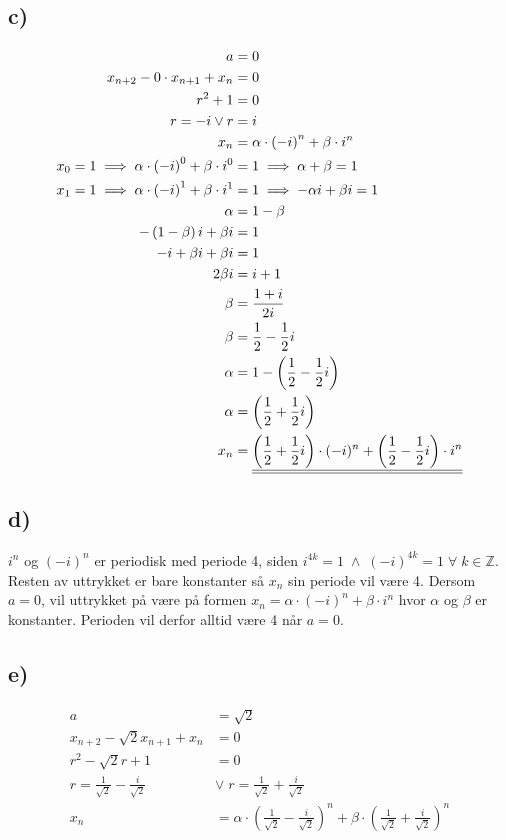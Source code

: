 \documentclass{article}
\begin{document}
\subsection*{c)}
\begin{align*}
	a&=0 \\
	x_{n+2}-0\cdot x_{n+1} + x_n &= 0\\
	r^2+1&=0\\
	r = -i \vee r &= i\\
	x_n &= \alpha \cdot \left(-i\right)^n + \beta \cdot i^n\\
	x_0 = 1 \implies \alpha \cdot \left(-i\right)^0 + \beta \cdot i^0 &= 1 \implies \alpha + \beta = 1\\
	x_1 = 1 \implies \alpha \cdot \left(-i\right)^1 + \beta \cdot i^1 &= 1 \implies -\alpha i + \beta i = 1\\
	\alpha &= 1 - \beta\\
	-\left(1 - \beta\right)i + \beta i &= 1\\
	-i + \beta i + \beta i &= 1\\
	2\beta i &= i+1\\
	\beta &= \frac{1+i}{2i}\\
	\beta &= \frac{1}{2} - \frac{1}{2} i\\
	\alpha &= 1 - \left(\frac{1}{2} - \frac{1}{2} i\right)\\
	\alpha &= \left(\frac{1}{2} + \frac{1}{2} i\right)\\
	x_n &=	\underline{\underline{\left(\frac{1}{2} + \frac{1}{2} i\right) \cdot (-i)^n + \left(\frac{1}{2} - \frac{1}{2} i\right) \cdot i^n}}\\
\end{align*}
\subsection*{d)}
$i^n$ og $(-i)^n$ er periodisk med periode 4, siden $i^{4k}=1 \;\wedge\; (-i)^{4k}=1 \;\forall\; k \in \mathbb{Z}$. Resten av uttrykket er bare konstanter så $x_n$ sin periode vil være 4. Dersom $a=0$, vil uttrykket på være på formen $x_n = \alpha \cdot \left(-i\right)^n + \beta \cdot i^n$ hvor $\alpha$ og $\beta$ er konstanter. Perioden vil derfor alltid være 4 når $a=0$.
\subsection*{e)}
\begin{align*}
	a&= \sqrt{2}\\
	x_{n+2} - \sqrt{2}x_{n+1} + x_n &= 0\\
	r^2 - \sqrt{2}r + 1 &= 0\\
	r = \frac{1}{\sqrt{2}}-\frac{i}{\sqrt{2}} \;&\vee\; r =\frac{1}{\sqrt{2}}+\frac{i}{\sqrt{2}}\\
	x_n &= \alpha \cdot \left(\frac{1}{\sqrt{2}}-\frac{i}{\sqrt{2}}\right)^n + \beta \cdot \left(\frac{1}{\sqrt{2}}+\frac{i}{\sqrt{2}}\right)^n
\end{align*}
\end{document}
